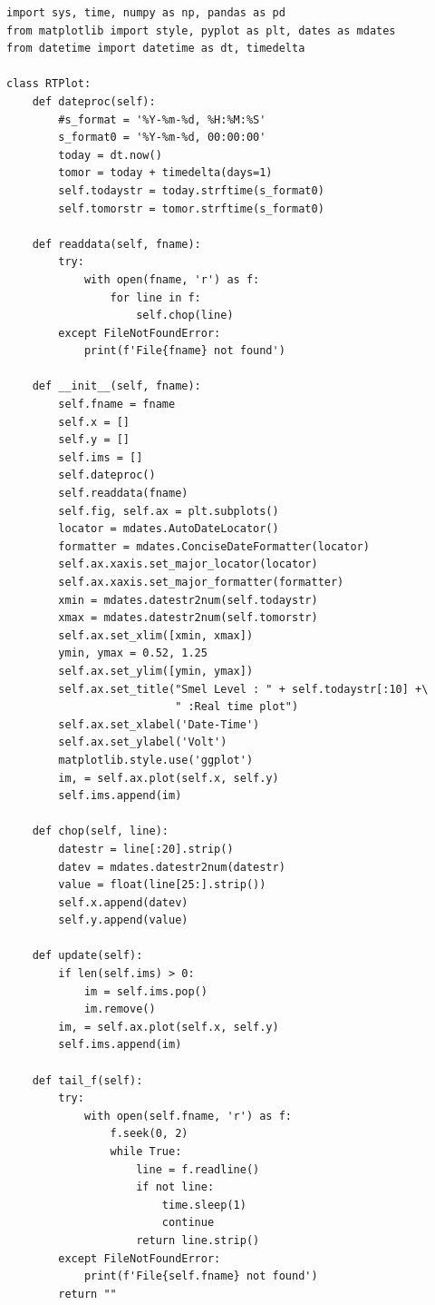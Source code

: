 \documentclass[12pt,a4paper,uplatex]{jsarticle}
\begin{document}
\begin{breakbox}%
	\begin{verbatim}
import sys, time, numpy as np, pandas as pd
from matplotlib import style, pyplot as plt, dates as mdates
from datetime import datetime as dt, timedelta

class RTPlot:
    def dateproc(self):
        #s_format = '%Y-%m-%d, %H:%M:%S'
        s_format0 = '%Y-%m-%d, 00:00:00'
        today = dt.now()
        tomor = today + timedelta(days=1)
        self.todaystr = today.strftime(s_format0)
        self.tomorstr = tomor.strftime(s_format0)

    def readdata(self, fname):
        try:
            with open(fname, 'r') as f:
                for line in f:
                    self.chop(line)
        except FileNotFoundError:
            print(f'File{fname} not found')

    def __init__(self, fname):
        self.fname = fname
        self.x = []
        self.y = []
        self.ims = []
        self.dateproc()
        self.readdata(fname)
        self.fig, self.ax = plt.subplots()
        locator = mdates.AutoDateLocator()
        formatter = mdates.ConciseDateFormatter(locator)
        self.ax.xaxis.set_major_locator(locator)
        self.ax.xaxis.set_major_formatter(formatter)
        xmin = mdates.datestr2num(self.todaystr)
        xmax = mdates.datestr2num(self.tomorstr) 
        self.ax.set_xlim([xmin, xmax])
        ymin, ymax = 0.52, 1.25
        self.ax.set_ylim([ymin, ymax])
        self.ax.set_title("Smel Level : " + self.todaystr[:10] +\
                          " :Real time plot")
        self.ax.set_xlabel('Date-Time')
        self.ax.set_ylabel('Volt')
        matplotlib.style.use('ggplot')
        im, = self.ax.plot(self.x, self.y)
        self.ims.append(im)

    def chop(self, line):
        datestr = line[:20].strip()
        datev = mdates.datestr2num(datestr)
        value = float(line[25:].strip())
        self.x.append(datev)
        self.y.append(value)

    def update(self):
        if len(self.ims) > 0:
            im = self.ims.pop()
            im.remove()
        im, = self.ax.plot(self.x, self.y)
        self.ims.append(im)

    def tail_f(self):
        try:
            with open(self.fname, 'r') as f:
                f.seek(0, 2)
                while True:
                    line = f.readline()
                    if not line:
                        time.sleep(1)
                        continue
                    return line.strip()
        except FileNotFoundError:
            print(f'File{self.fname} not found')
        return ""


\end{verbatim}
\end{breakbox}
\end{document}
